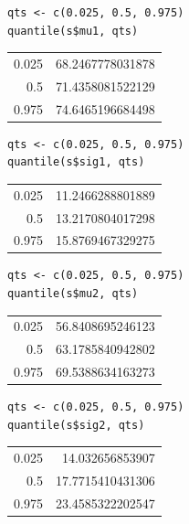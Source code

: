 \documentclass[11pt]{article}
\begin{document}
\begin{verbatim}
qts <- c(0.025, 0.5, 0.975)
quantile(s$mu1, qts)
\end{verbatim}

\begin{center}
\begin{tabular}{rr}
0.025 & 68.2467778031878\\
0.5 & 71.4358081522129\\
0.975 & 74.6465196684498\\
\end{tabular}
\end{center}


\begin{verbatim}
qts <- c(0.025, 0.5, 0.975)
quantile(s$sig1, qts)
\end{verbatim}

\begin{center}
\begin{tabular}{rr}
0.025 & 11.2466288801889\\
0.5 & 13.2170804017298\\
0.975 & 15.8769467329275\\
\end{tabular}
\end{center}

\begin{verbatim}
qts <- c(0.025, 0.5, 0.975)
quantile(s$mu2, qts)
\end{verbatim}

\begin{center}
\begin{tabular}{rr}
0.025 & 56.8408695246123\\
0.5 & 63.1785840942802\\
0.975 & 69.5388634163273\\
\end{tabular}
\end{center}

\begin{verbatim}
qts <- c(0.025, 0.5, 0.975)
quantile(s$sig2, qts)
\end{verbatim}

\begin{center}
\begin{tabular}{rr}
0.025 & 14.032656853907\\
0.5 & 17.7715410431306\\
0.975 & 23.4585322202547\\
\end{tabular}
\end{center}
\end{document}

